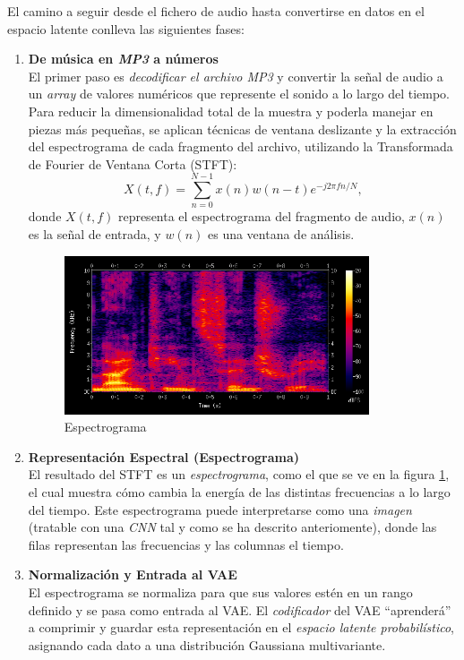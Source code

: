 El camino a seguir desde el fichero de audio hasta convertirse en datos en el espacio latente conlleva las siguientes fases:

\begin{enumerate}
    \item \textbf{De música en \emph{MP3} a números} \\
    El primer paso es \emph{decodificar el archivo MP3} y convertir la señal de audio a un \emph{array} de valores numéricos que represente el sonido a lo largo del tiempo. Para reducir la dimensionalidad total de la muestra y poderla manejar en piezas más pequeñas, se aplican técnicas de ventana deslizante y la extracción del espectrograma de cada fragmento del archivo, utilizando la Transformada de Fourier de Ventana Corta (STFT):
    \[
        X(t, f) = \sum_{n=0}^{N-1} x(n)w(n-t)e^{-j2\pi fn/N},
    \]
    donde $X(t, f)$ representa el espectrograma del fragmento de audio, $x(n)$ es la señal de entrada, y $w(n)$ es una ventana de análisis.

    \begin{figure}[H]
      \centering
      \includegraphics[width=0.85\textwidth]{images/espectrograma.png}
      \caption{Espectrograma}
      \label{fig:espectrograma}
    \end{figure}

    \item \textbf{Representación Espectral (Espectrograma)} \\
    El resultado del STFT es un \emph{espectrograma}, como el que se ve en la figura \ref{fig:espectrograma}, el cual muestra cómo cambia la energía de las distintas frecuencias a lo largo del tiempo. Este espectrograma puede interpretarse como una \emph{imagen} (tratable con una \emph{CNN} tal y como se ha descrito anteriomente), donde las filas representan las frecuencias y las columnas el tiempo.

    \item \textbf{Normalización y Entrada al VAE} \\
    El espectrograma se normaliza para que sus valores estén en un rango definido y se pasa como entrada al VAE. El \emph{codificador} del VAE ``aprenderá'' a comprimir y guardar esta representación en el \emph{espacio latente probabilístico}, asignando cada dato a una distribución Gaussiana multivariante.


\end{enumerate}
